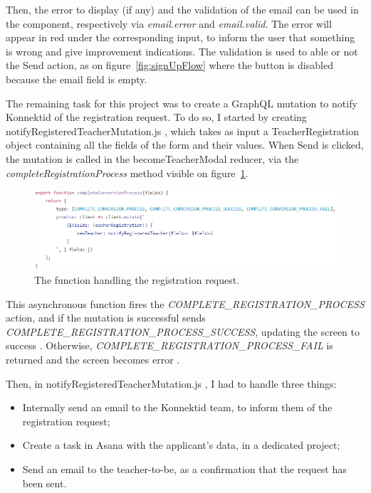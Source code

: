 Then, the error to display (if any) and the validation of the email can be used in the component, respectively via \textit{email.error} and \textit{email.valid}. The error will appear in red under the corresponding input, to inform the user that something is wrong and give improvement indications. The validation is used to able or not the \guillemotleft{} Send \guillemotright{} action, as on {\sc figure}~\ref{fig:signUpFlow} where the button is disabled because the email field is empty.

The remaining task for this project was to create a GraphQL mutation to notify Konnektid of the registration request. To do so, I started by creating \guillemotleft{} notifyRegisteredTeacherMutation.js \guillemotright{}, which takes as input a \guillemotleft{} TeacherRegistration \guillemotright{} object containing all the fields of the form and their values. When \guillemotleft{} Send \guillemotright{} is clicked, the mutation is called in the \guillemotleft{} becomeTeacherModal \guillemotright{} reducer, via the \textit{completeRegistrationProcess} method visible on {\sc figure}~\ref{fig:completeRegistration}.

 \begin{figure}[H]
    \centering
    \includegraphics[scale=0.8]{figure/completeRegistration.png}
    \caption{The function handling the registration request.}
    \label{fig:completeRegistration}
\end{figure}

This asynchronous function fires the \textit{COMPLETE\_REGISTRATION\_PROCESS} action, and if the mutation is successful sends \textit{COMPLETE\_REGISTRATION\_PROCESS\_SUCCESS}, updating the screen to \guillemotleft{} success \guillemotright{}. Otherwise, \textit{COMPLETE\_REGISTRATION\_PROCESS\_FAIL} is returned and the screen becomes \guillemotleft{} error \guillemotright{}.

Then, in \guillemotleft{} notifyRegisteredTeacherMutation.js \guillemotright{}, I had to handle three things:
\begin{itemize}[noitemsep]
    \item Internally send an email to the Konnektid team, to inform them of the registration request;
    \item Create a task in Asana with the applicant's data, in a dedicated project;
    \item Send an email to the teacher-to-be, as a confirmation that the request has been sent.
\end{itemize}

